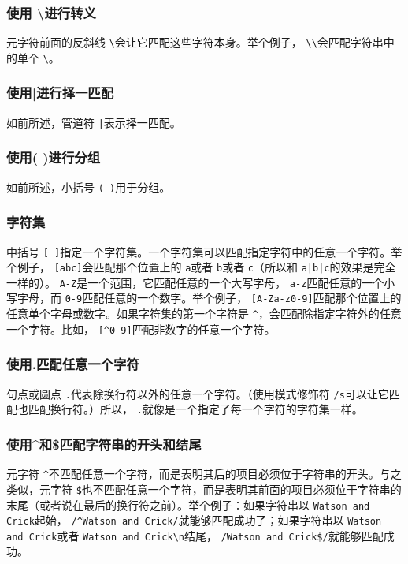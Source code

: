 \subsubsection{使用 \textbackslash 进行转义}
元字符前面的反斜线 \verb|\|会让它匹配这些字符本身。举个例子， \verb|\\|会匹配字符串中的单个 \verb|\|。

\subsubsection{使用|进行择一匹配}
如前所述，管道符 \verb=|=表示择一匹配。

\subsubsection{使用( )进行分组}
如前所述，小括号 \verb|( )|用于分组。

\subsubsection{字符集}
中括号 \verb|[ ]|指定一个字符集。一个字符集可以匹配指定字符中的任意一个字符。举个例子， \verb|[abc]|会匹配那个位置上的 \verb|a|或者 \verb|b|或者 \verb|c|（所以和 \verb=a|b|c=的效果是完全一样的）。 \verb|A-Z|是一个范围，它匹配任意的一个大写字母， \verb|a-z|匹配任意的一个小写字母，而 \verb|0-9|匹配任意的一个数字。举个例子， \verb|[A-Za-z0-9]|匹配那个位置上的任意单个字母或数字。如果字符集的第一个字符是 \verb|^|，会匹配除指定字符外的任意一个字符。比如， \verb|[^0-9]|匹配非数字的任意一个字符。

\subsubsection{使用.匹配任意一个字符}
句点或圆点 \verb|.|代表除换行符以外的任意一个字符。（使用模式修饰符 \verb|/s|可以让它匹配也匹配换行符。）所以， \verb|.|就像是一个指定了每一个字符的字符集一样。

\subsubsection{使用\^{}和\$匹配字符串的开头和结尾}
元字符 \verb|^|不匹配任意一个字符，而是表明其后的项目必须位于字符串的开头。与之类似，元字符 \verb|$|也不匹配任意一个字符，而是表明其前面的项目必须位于字符串的末尾（或者说在最后的换行符之前）。举个例子：如果字符串以 \verb|Watson and Crick|起始， \verb|/^Watson and Crick/|就能够匹配成功了；如果字符串以 \verb|Watson and Crick|或者 \verb|Watson and Crick\n|结尾， \verb|/Watson and Crick$/|就能够匹配成功。

